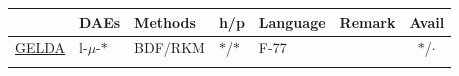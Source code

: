 \documentclass[]{book}
\theoremstyle{definition}
\theoremstyle{definition}
\theoremstyle{definition}
\theoremstyle{remark}
\begin{document}
\begin{longtable}[]{@{}llllllc@{}}
\toprule
\begin{minipage}[b]{0.07\columnwidth}\raggedright\strut
\strut
\end{minipage} & \begin{minipage}[b]{0.07\columnwidth}\raggedright\strut
DAEs\strut
\end{minipage} & \begin{minipage}[b]{0.10\columnwidth}\raggedright\strut
Methods\strut
\end{minipage} & \begin{minipage}[b]{0.06\columnwidth}\raggedright\strut
h/p\strut
\end{minipage} & \begin{minipage}[b]{0.07\columnwidth}\raggedright\strut
Language\strut
\end{minipage} & \begin{minipage}[b]{0.37\columnwidth}\raggedright\strut
Remark\strut
\end{minipage} & \begin{minipage}[b]{0.06\columnwidth}\centering\strut
Avail\strut
\end{minipage}\tabularnewline
\midrule
\endhead
\begin{minipage}[t]{0.07\columnwidth}\raggedright\strut
\href{https://doi.org/10.1137/S1064827595286347}{GELDA}\strut
\end{minipage} & \begin{minipage}[t]{0.07\columnwidth}\raggedright\strut
l-\(\mu\)-\(*\)\strut
\end{minipage} & \begin{minipage}[t]{0.10\columnwidth}\raggedright\strut
BDF/RKM\strut
\end{minipage} & \begin{minipage}[t]{0.06\columnwidth}\raggedright\strut
\(*\)/\(*\)\strut
\end{minipage} & \begin{minipage}[t]{0.07\columnwidth}\raggedright\strut
F-77\strut
\end{minipage} & \begin{minipage}[t]{0.37\columnwidth}\raggedright\strut
\strut
\end{minipage} & \begin{minipage}[t]{0.06\columnwidth}\centering\strut
\(*\)/\(\cdot\)\strut
\end{minipage}\tabularnewline
\begin{minipage}[t]{0.07\columnwidth}\raggedright\strut

\end{minipage}
\end{longtable}
\end{document}

